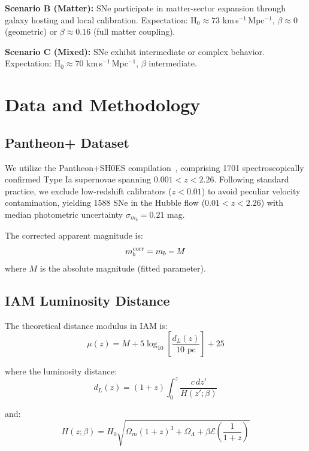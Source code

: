 \documentclass[twocolumn,superscriptaddress,prd,amsmath,amssymb]{revtex4-2}
\begin{document}
\textbf{Scenario B (Matter):} SNe participate in matter-sector expansion through galaxy hosting and local calibration. Expectation: H$_0 \approx 73$ km\,s$^{-1}$\,Mpc$^{-1}$, $\beta \approx 0$ (geometric) or $\beta \approx 0.16$ (full matter coupling).

\textbf{Scenario C (Mixed):} SNe exhibit intermediate or complex behavior. Expectation: H$_0 \approx 70$ km\,s$^{-1}$\,Mpc$^{-1}$, $\beta$ intermediate.

\section{Data and Methodology}

\subsection{Pantheon+ Dataset}

We utilize the Pantheon+SH0ES compilation~\cite{Brout2022}, comprising 1701 spectroscopically confirmed Type Ia supernovae spanning $0.001 < z < 2.26$. Following standard practice, we exclude low-redshift calibrators ($z < 0.01$) to avoid peculiar velocity contamination, yielding 1588 SNe in the Hubble flow ($0.01 < z < 2.26$) with median photometric uncertainty $\sigma_{m_b} = 0.21$ mag.

The corrected apparent magnitude is:
\begin{equation}
m_b^{\rm corr} = m_b - M
\end{equation}
where $M$ is the absolute magnitude (fitted parameter).

\subsection{IAM Luminosity Distance}

The theoretical distance modulus in IAM is:
\begin{equation}
\mu(z) = M + 5\log_{10}\left[\frac{d_L(z)}{10 \text{ pc}}\right] + 25
\end{equation}

where the luminosity distance:
\begin{equation}
d_L(z) = (1+z) \int_0^z \frac{c\,dz'}{H(z';\beta)}
\end{equation}

and:
\begin{equation}
H(z;\beta) = H_0\sqrt{\Omega_m(1+z)^3 + \Omega_\Lambda + \beta\mathcal{E}\left(\frac{1}{1+z}\right)}
\end{equation}
\end{document}
